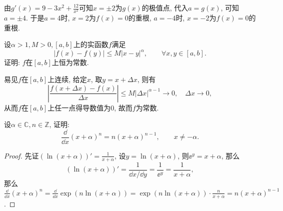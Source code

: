 \begin{quiza}
\begin{solution}
由\(g'(x)=9-3x^2+\frac{12}{x^2}\)可知\(x=\pm 2\)为\(g(x)\)的极值点, 代入\(a=g(x)\), 可知\(a=\pm 4\). 于是\(a=4\)时, \(x=2\)为\(f(x)=0\)的重根, \(a=-4\)时, \(x=-2\)为\(f(x)=0\)的重根.
\end{solution}
\woe 设\(\alpha>1,M>0,[a,b]\)上的实函数\(f\)满足\[|f(x)-f(y)|\leqslant M|x-y|^\alpha,\qquad\forall x,y\in[a,b].\]证明: \(f\)在\([a,b]\)上恒为常数.
\begin{solution}
易见\(f\)在\([a,b]\)上连续, 给定\(x\), 取\(y=x+\Delta x\), 则有\[\left|\frac{f(x+\Delta x)-f(x)}{\Delta x}\right|\leqslant M\left|\Delta x\right|^{\alpha -1}\rightarrow 0,\quad\Delta x\rightarrow 0,\]从而\(f\)在\([a,b]\)上任一点得导数值为\(0\), 故而\(f\)为常数.
\end{solution}
\woe 设\(\alpha\in\mathbb{C},n\in\mathbb{Z}\), 证明:\[\frac{\dd}{\dd x}(x+\alpha)^n=n(x+\alpha)^{n-1},\qquad x\ne -\alpha.\]
\begin{proof}
先证\(\left(\ln(x+\alpha)\right)'=\frac{1}{x+\alpha}\), 设\(y=\ln(x+\alpha)\), 则\(\ee^y=x+\alpha\), 那么\[\left(\ln(x+\alpha)\right)'=\frac{1}{\dd x/\dd y}=\frac{1}{\ee^y}=\frac{1}{x+\alpha},\]那么\(\frac{\dd}{\dd x}(x+\alpha)^n=\frac{\dd}{\dd x}\exp(n\ln(x+\alpha))=\exp\left(n\ln(x+\alpha)\right)\cdot\frac{n}{x+\alpha}=n(x+\alpha)^{n-1}\).
\end{proof}
\end{quiza}

